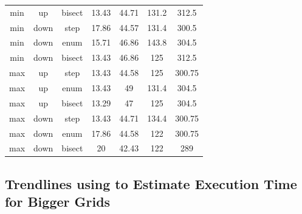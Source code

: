 \documentclass[runningheads]{llncs}
\begin{document}
\begin{table}
\begin{tabularx}{\textwidth}{|C|C|C|C|C|C|C|}
        min      & up   & bisect & 13.43 & 44.71 & 131.2  & 312.5  \\
        min      & down & step   & 17.86 & 44.57 & 131.4  & 300.5  \\
        min      & down & enum   & 15.71 & 46.86 & 143.8  & 304.5  \\
        min      & down & bisect & 13.43 & 46.86 & 125    & 312.5  \\
        max      & up   & step   & 13.43 & 44.58 & 125    & 300.75 \\
        max      & up   & enum   & 13.43 & 49    & 131.4  & 304.5  \\
        max      & up   & bisect & 13.29 & 47    & 125    & 304.5  \\
        max      & down & step   & 13.43 & 44.71 & 134.4  & 300.75 \\
        max      & down & enum   & 17.86 & 44.58 & 122    & 300.75 \\
        max      & down & bisect & 20    & 42.43 & 122    & 289    \\
        \hline
    \end{tabularx}
\end{table}

\subsection{Trendlines using to Estimate Execution Time for Bigger Grids} \label{trendlines}
\end{document}
